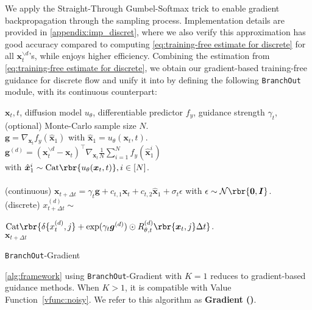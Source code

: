 We apply the Straight-Through Gumbel-Softmax trick \citep{jang2016categorical} to enable gradient backpropagation through the sampling process. Implementation details are provided in \cref{appendix:imp_discret}, where we also verify this approximation has good accuracy compared to computing \eqref{eq:training-free estimate for discrete} for all $\boldsymbol{x}_t^{\backslash d}$'s, while enjoys higher efficiency. Combining the estimation from \eqref{eq:training-free estimate for discrete}, we obtain our gradient-based training-free guidance for discrete flow and unify it into \ouralg by defining the following \texttt{BranchOut} module, with its continuous counterpart:
\begin{module}[htb]
\begin{algorithmic}[1]
 $\boldsymbol{x}_t, t$, diffusion model $u_\theta$, differentiable predictor $f_y$, guidance strength $\gamma_t$, (optional) Monte-Carlo sample size $N$.
\\
 $\boldsymbol{g} = \nabla_{\boldsymbol{x}_t}f_y(\hat{\boldsymbol{x}}_1)$ with  $\hat{\boldsymbol{x}}_1 = u_\theta(\boldsymbol{x}_t,t)$. \\
 $\boldsymbol{g}^{(d)} = (\boldsymbol{x}_t^{\backslash
       d} - \boldsymbol{x}_t)^{\top} \nabla_{\boldsymbol{x}_t}\frac{1}{N}\sum_{i=1}^N f_y({\hat{\boldsymbol{x}}_1^{i}}) $\\
       \quad  with $\hat{\boldsymbol{x}}_1^i \sim \text{Cat}\rbr{u_\theta( \boldsymbol{x}_{t},t)}, i \in[N]$. \\
\\
\quad (continuous) $\boldsymbol{x}_{t+\Delta t} =\gamma_t \boldsymbol{g}+ c_{t,1} \boldsymbol{x}_t + c_{t,2} \hat{\boldsymbol{x}}_1 + \sigma_t \epsilon $ with $\epsilon \sim \mathcal{N}\rbr{\boldsymbol{0},\boldsymbol{I}}$.\\
\quad(discrete) ${x}_{t+\Delta t}^{(d)} \sim $ 


\quad$ \text{Cat}\rbr{\delta\{x_t^{(d)}, j \} + \exp(\gamma_t\boldsymbol{g}^{(d)}) \odot R^{(d)}_{\theta, t}\rbr{\boldsymbol{x}_t, j } \Delta t }$.  \\
 { $\boldsymbol{x}_{t + \Delta t}$}
\end{algorithmic}
\caption{\texttt{BranchOut}-Gradient}
\label{mol:grad guidance}
\end{module}

\cref{alg:framework} using \texttt{BranchOut}-Gradient with $K=1$ reduces to gradient-based guidance methods. When $K > 1$, it is compatible with Value Function~\ref{vfunc:noisy}. We refer to this algorithm as \textbf{\ouralg Gradient (\xtgrad)}.









